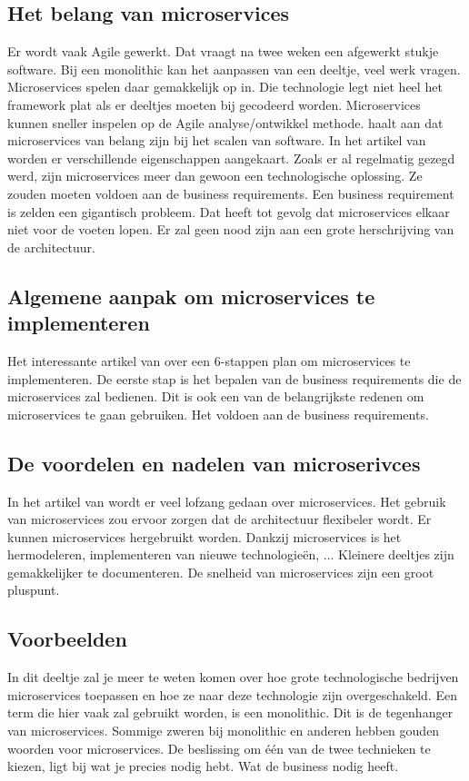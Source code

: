 \subsection{Het belang van microservices}
Er wordt vaak Agile gewerkt. Dat vraagt na twee weken een afgewerkt stukje software. Bij een monolithic kan het aanpassen van een deeltje, veel werk vragen. Microservices spelen daar gemakkelijk op in. Die technologie legt niet heel het framework plat als er deeltjes moeten bij gecodeerd worden. Microservices kunnen sneller inspelen op de Agile analyse/ontwikkel methode.
\textcite{series2018} haalt aan dat microservices van belang zijn bij het scalen van software.
In het artikel van \textcite{RDX2016} worden er verschillende eigenschappen aangekaart. Zoals er al regelmatig gezegd werd, zijn microservices meer dan gewoon een technologische oplossing. Ze zouden moeten voldoen aan de business requirements. Een business requirement is zelden een gigantisch probleem. Dat heeft tot gevolg dat microservices elkaar niet voor de voeten lopen. Er zal geen nood zijn aan een grote herschrijving van de architectuur.
\subsection{Algemene aanpak om microservices te implementeren}
Het interessante artikel van \textcite{Benetis2016} over een 6-stappen plan om microservices te implementeren.
De eerste stap is het bepalen van de business requirements die de microservices zal bedienen. Dit is ook een van de belangrijkste redenen om microservices te gaan gebruiken. Het voldoen aan de business requirements. 
\subsection{De voordelen en nadelen van microserivces}
In het artikel van \textcite{series2018} wordt er veel lofzang gedaan over microservices. Het gebruik van microservices zou ervoor zorgen dat de architectuur flexibeler wordt. Er kunnen microservices hergebruikt worden. Dankzij microservices is het hermodeleren, implementeren van nieuwe technologieën, ... 
Kleinere deeltjes zijn gemakkelijker te documenteren. De snelheid van microservices zijn een groot pluspunt.
\subsection{Voorbeelden}
In dit deeltje zal je meer te weten komen over hoe grote technologische bedrijven microservices toepassen en hoe ze naar deze technologie zijn overgeschakeld.
Een term die hier vaak zal gebruikt worden, is een monolithic. Dit is de tegenhanger van microservices. Sommige zweren bij monolithic en anderen hebben gouden woorden voor microservices. De beslissing om één van de twee technieken te kiezen, ligt bij wat je precies nodig hebt. Wat de business nodig heeft. 
